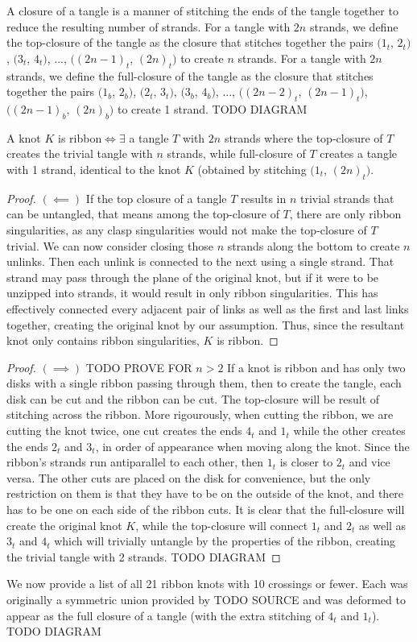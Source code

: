 \begin{paper}
A closure of a tangle is a manner of stitching the ends of the tangle together
to reduce the resulting number of strands.
For a tangle with $2n$ strands, we define the top-closure of the tangle as the
closure that stitches together the pairs $(1_t$, $2_t)$, $(3_t$, $4_t)$, ...,
$((2n-1)_t$, $(2n)_t)$ to create $n$ strands.
For a tangle with $2n$ strands, we define the full-closure of the tangle as the
closure that stitches together the pairs $(1_b$, $2_b)$, $(2_t$, $3_t)$, $(3_b$,
$4_b)$, ..., $((2n-2)_t$, $(2n-1)_t)$, $((2n-1)_b$, $(2n)_b)$ to create 1
strand.
TODO DIAGRAM
\begin{theorem}
A knot $K$ is ribbon$\iff\exists$ a tangle $T$ with $2n$ strands where the
top-closure of $T$ creates the trivial tangle with $n$ strands, while
full-closure of $T$ creates a tangle with 1 strand, identical to the knot $K$
(obtained by stitching $(1_t$, $(2n)_t)$.
\end{theorem}
\begin{proof}
$(\impliedby)$
If the top closure of a tangle $T$ results in $n$ trivial strands that can be
untangled, that means among the top-closure of $T$, there are only ribbon
singularities, as any clasp singularities would not make the top-closure of $T$
trivial.
We can now consider closing those $n$ strands along the bottom to create $n$
unlinks.
Then each unlink is connected to the next using a single strand.
That strand may pass through the plane of the original knot, but if it were to
be unzipped into strands, it would result in only ribbon singularities.
This has effectively connected every adjacent pair of links as well as the first
and last links together, creating the original knot by our assumption.
Thus, since the resultant knot only contains ribbon singularities, $K$ is
ribbon.
\end{proof}
\begin{proof}
$(\implies)$
TODO PROVE FOR $n>2$
If a knot is ribbon and has only two disks with a single ribbon passing through
them, then to create the tangle, each disk can be cut and the ribbon can be cut.
The top-closure will be result of stitching across the ribbon.
More rigourously, when cutting the ribbon, we are cutting the knot twice, one
cut creates the ends $4_t$ and $1_t$ while the other creates the ends $2_t$ and
$3_t$, in order of appearance when moving along the knot.
Since the ribbon's strands run antiparallel to each other, then $1_t$ is closer
to $2_t$ and vice versa.
The other cuts are placed on the disk for convenience, but the only restriction
on them is that they have to be on the outside of the knot, and there has to be
one on each side of the ribbon cuts.
It is clear that the full-closure will create the original knot $K$, while the
top-closure will connect $1_t$ and $2_t$ as well as $3_t$ and $4_t$ which will
trivially untangle by the properties of the ribbon, creating the trivial tangle
with 2 strands.
TODO DIAGRAM
\end{proof}
We now provide a list of all 21 ribbon knots with 10 crossings or fewer.
Each was originally a symmetric union provided by TODO SOURCE and was deformed
to appear as the full closure of a tangle (with the extra stitching of $4_t$ and
$1_t$).
TODO DIAGRAM


\end{paper}
